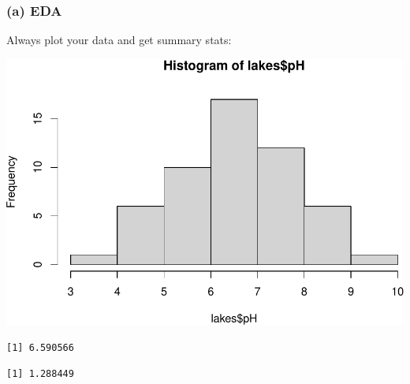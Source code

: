 \documentclass[
]{book}
\newenvironment{Shaded}{\begin{snugshade}}{\end{snugshade}}
\newcommand{\FunctionTok}[1]{\textcolor[rgb]{0.00,0.00,0.00}{#1}}
\newcommand{\NormalTok}[1]{#1}
\newcommand{\SpecialCharTok}[1]{\textcolor[rgb]{0.00,0.00,0.00}{#1}}
\begin{document}
\hypertarget{a-eda}{%
\subsubsection{(a) EDA}\label{a-eda}}

Always plot your data and get summary stats:

\begin{Shaded}
\end{Shaded}

\includegraphics[width=1\linewidth]{Class_Activity_18_files/figure-latex/unnamed-chunk-2-1}

\begin{Shaded}
\end{Shaded}

\begin{verbatim}
[1] 6.590566
\end{verbatim}

\begin{Shaded}
\end{Shaded}

\begin{verbatim}
[1] 1.288449
\end{verbatim}
\end{document}
